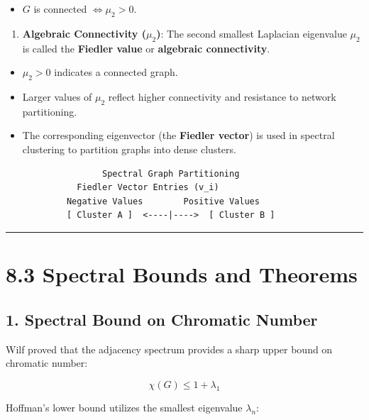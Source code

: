 \documentclass[
]{book}
\providecommand{\tightlist}{%
  \setlength{\itemsep}{0pt}\setlength{\parskip}{0pt}}
\theoremstyle{definition}
\theoremstyle{definition}
\theoremstyle{definition}
\theoremstyle{definition}
\theoremstyle{remark}
\begin{document}
\begin{itemize}
\tightlist
\item
  \(G\) is connected \(\iff \mu_2 > 0\).
\end{itemize}

\begin{enumerate}
\def\labelenumi{\arabic{enumi}.}
\setcounter{enumi}{1}
\tightlist
\item
  \textbf{Algebraic Connectivity (\(\mu_2\))}:
  The second smallest Laplacian eigenvalue \(\mu_2\) is called the \textbf{Fiedler value} or \textbf{algebraic connectivity}.
\end{enumerate}

\begin{itemize}
\tightlist
\item
  \(\mu_2 > 0\) indicates a connected graph.
\item
  Larger values of \(\mu_2\) reflect higher connectivity and resistance to network partitioning.
\item
  The corresponding eigenvector (the \textbf{Fiedler vector}) is used in spectral clustering to partition graphs into dense clusters.
\end{itemize}

\begin{verbatim}
                   Spectral Graph Partitioning
              Fiedler Vector Entries (v_i)
            Negative Values        Positive Values
            [ Cluster A ]  <----|---->  [ Cluster B ]
\end{verbatim}

\begin{center}\rule{0.5\linewidth}{0.5pt}\end{center}

\section{8.3 Spectral Bounds and Theorems}\label{spectral-bounds-and-theorems}

\subsection{1. Spectral Bound on Chromatic Number}\label{spectral-bound-on-chromatic-number}

Wilf proved that the adjacency spectrum provides a sharp upper bound on chromatic number:

\[\chi(G) \le 1 + \lambda_1\]

Hoffman's lower bound utilizes the smallest eigenvalue \(\lambda_n\):
\end{document}
